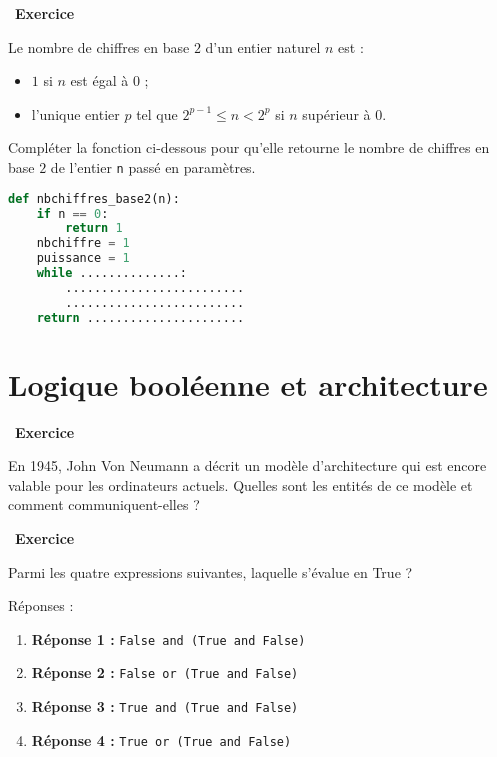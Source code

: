 \documentclass[
  11pt,
]{article}
\newcommand{\passthrough}[1]{#1}
\providecommand{\tightlist}{%
  \setlength{\itemsep}{0pt}\setlength{\parskip}{0pt}}
\newcounter{exo}
\newenvironment{exercice}[1]
{\par \medskip   \addtocounter{exo}{1} \noindent  
\begin{bclogo}[arrondi =0.1,   noborder = true, logo=\bccrayon, marge=4]{~\textbf{Exercice} \textbf{\theexo} {\itshape #1} }  \par}
{
\end{bclogo}
 \par \bigskip }
\newcounter{def}
\newcounter{logi}
\begin{document}
\begin{exercice}{}

Le nombre de chiffres en base \(2\) d'un entier naturel \(n\) est :

\begin{itemize}
\tightlist
\item
  \(1\) si \(n\) est égal à \(0\) ;
\item
  l'unique entier \(p\) tel que \(2^{p-1} \leqslant n < 2^{p}\) si \(n\)
  supérieur à \(0\).
\end{itemize}

Compléter la fonction ci-dessous pour qu'elle retourne le nombre de
chiffres en base \(2\) de l'entier \texttt{n} passé en paramètres.

\begin{lstlisting}[language=Python]
def nbchiffres_base2(n):
    if n == 0:
        return 1
    nbchiffre = 1
    puissance = 1
    while ..............:
        .........................
        .........................
    return ......................
\end{lstlisting}

\end{exercice}

\hypertarget{logique-booluxe9enne-et-architecture}{%
\section{Logique booléenne et
architecture}\label{logique-booluxe9enne-et-architecture}}

\begin{exercice}{}

En 1945, John Von Neumann a décrit un modèle d'architecture qui est
encore valable pour les ordinateurs actuels. Quelles sont les entités de
ce modèle et comment communiquent-elles ?

\end{exercice}

\begin{exercice}{}

Parmi les quatre expressions suivantes, laquelle s'évalue en True ?

Réponses :

\begin{enumerate}
\def\labelenumi{\arabic{enumi}.}
\item
  \textbf{Réponse 1 :}
  \passthrough{\lstinline!False and (True and False)!}
\item
  \textbf{Réponse 2 :}
  \passthrough{\lstinline!False or (True and False)!}
\item
  \textbf{Réponse 3 :}
  \passthrough{\lstinline!True and (True and False)!}
\item
  \textbf{Réponse 4 :}
  \passthrough{\lstinline!True or (True and False)!}
\end{enumerate}

\end{exercice}
\end{document}
